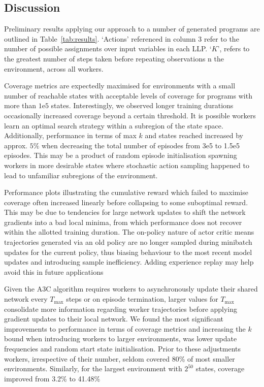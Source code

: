 \documentclass[conference,compsoc]{IEEEtran}
\begin{document}
\subsection{Discussion}
Preliminary results applying our approach to a number of generated programs are outlined in Table~\ref{tab:results}. `Actions' referenced in column 3 refer to the number of possible assignments over input variables in each LLP. `$K$', refers to the greatest number of steps taken before repeating observations n the environment, across all workers.

Coverage metrics are expectedly maximised for environments with a small number of reachable states with acceptable levels of coverage for programs with more than $1\mathrm{e}{5}$ states. Interestingly, we observed longer training durations occasionally increased coverage beyond a certain threshold. It is possible workers learn an optimal search strategy within a subregion of the state space. Additionally, performance in terms of max $k$ and states reached increased by approx. $5\%$ when decreasing the total number of episodes from 3e5 to 1.5e5 episodes.  This may be a product of random episode initialisation spawning workers in more desirable states where stochastic action sampling happened to lead to unfamiliar subregions of the environment.

Performance plots illustrating the cumulative reward  which failed to maximise coverage often increased linearly before collapsing to some suboptimal reward.  This may be due to tendencies for large network updates to shift the network gradients into a bad local minima, from which performance does not recover within the allotted training duration. The on-policy nature of actor critic means trajectories generated via an old policy are no longer sampled during minibatch updates for the current policy,  thus biasing behaviour to the most recent model updates and introducing sample inefficiency. Adding experience replay \cite{wang2017sample} may help avoid this in future applications

Given the A3C algorithm requires workers to asynchronously update their shared network every $T_{\max}$ steps or on episode termination, larger values for $T_{\max}$ consolidate more information regarding worker trajectories before applying gradient updates to their local network. We found the most significant improvements to performance in terms of coverage metrics and increasing the $k$ bound when introducing workers to larger environments, was lower update frequencies and random start state initialisation. Prior to these adjustments workers, irrespective of their number, seldom covered 80\% of most smaller environments. Similarly, for the largest environment with $2^{50}$ states, coverage improved from 3.2\% to 41.48\%
\end{document}
